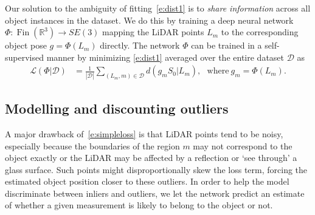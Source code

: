 

Our solution to the ambiguity of fitting~\cref{e:dist1} is to \emph{share information} across all object instances in the dataset.
We do this by training a deep neural network
$
\Phi : \operatorname{Fin}(\mathbb{R}^3) \rightarrow SE(3)
$
mapping the LiDAR points $L_m$ to the corresponding object pose $g = \Phi(L_m)$ directly.
The network $\Phi$ can be trained in a self-supervised manner by minimizing \cref{e:dist1} averaged over the entire dataset
$
\mathcal{D}
$
as
\begin{align}\label{e:simpleloss}
  \mathcal{L}(\Phi|\mathcal{D})
  &=
  \frac{1}{|\mathcal{D}|}
  \sum_{(L_m,m)\in\mathcal{D}}
  d(g_m S_0 | L_{m}),
  ~~~
  \text{where} ~ g_m = \Phi(L_m).
\end{align}

\subsection{Modelling and discounting outliers}

% 


A major drawback of~\cref{e:simpleloss} is that LiDAR points tend to be noisy, especially because the boundaries of the region $m$ may not correspond to the object exactly or the LiDAR may be affected by a reflection or `see through' a glass surface.
Such points might disproportionally skew the loss term, forcing the estimated object position closer to these outliers.
In order to help the model discriminate between inliers and outliers, we let the network predict an estimate of whether a given measurement is likely to belong to the object or not.

